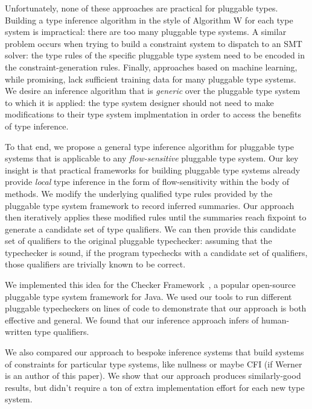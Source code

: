 Unfortunately, none of these approaches are practical for pluggable types.
Building a type inference algorithm in the style of Algorithm W for each
type system is impractical: there are too many pluggable type systems.
A similar problem occurs when trying to build a constraint system to
dispatch to an SMT solver: the type rules of the specific pluggable type system
need to be encoded in the constraint-generation rules. Finally, approaches
based on machine learning, while promising, lack sufficient training data for
many pluggable type systems.
%
We desire an
inference algorithm that is \emph{generic} over the pluggable type system
to which it is applied: the type system designer should not need to
make modifications to their type system implmentation in order to access
the benefits of type inference.

To that end, we propose a general type inference algorithm for pluggable type
systems that is applicable to any \emph{flow-sensitive} pluggable type system.
Our key insight is that
practical frameworks for building pluggable type systems already provide
\emph{local} type inference in the form of flow-sensitivity within the body
of methods.
We modify the underlying qualified type rules provided by the pluggable type
system framework to record inferred summaries.
Our approach then iteratively applies these modified rules until the summaries
reach fixpoint to generate a candidate set of type qualifiers.
We can then provide this candidate set of qualifiers to the original
pluggable typechecker: assuming that the typechecker is sound, if the program
typechecks with a candidate set of qualifiers, those qualifiers are trivially
known to be correct.

We implemented this idea for the Checker Framework~\cite{PapiACPE2008},
a popular open-source pluggable type system
framework for Java.
%
%
We used our tools to run  different pluggable typecheckers
on  lines of code to demonstrate that
our approach is both effective and general.
We found that our inference approach infers  of human-written
type qualifiers.

We also compared our approach to bespoke inference systems that build
systems of constraints for particular type systems, like nullness or
maybe CFI (if Werner is an author of this paper). We show that our approach
produces similarly-good results, but didn't require a ton of extra
implementation effort for each new type system.

